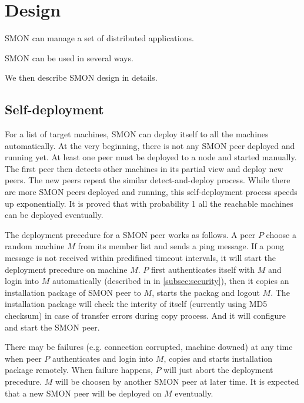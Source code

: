 \section{Design}


SMON can manage a set of distributed applications.

SMON can be used in several ways.

We then describe SMON design in details.

\subsection{Self-deployment}

For a list of target machines, SMON can deploy itself to all
the machines automatically. At the very beginning, there is
not any SMON peer deployed and running yet. At least one
peer must be deployed to a node and started manually.  The
first peer then detects other machines in its partial view
and deploy new peers. The new peers repeat the similar
detect-and-deploy process. While there are more SMON peers
deployed and running, this self-deployment process speeds up
exponentially. It is proved that with probability 1 all the
reachable machines can be deployed
eventually\cite{Eugster2004}.

The deployment precedure for a SMON peer works as follows.
A peer $P$ choose a random machine $M$ from its member list
and sends a ping message. If a pong message is not received
within predifined timeout intervals, it will start the
deployment precedure on machine $M$. $P$ first authenticates
itself with $M$ and login into $M$ automatically (described
in in \ref{subsec:security}), then it copies an installation
package of SMON peer to $M$, starts the packag and logout
$M$. The installation package will check the interity of
itself (currently using MD5 checksum) in case of transfer
errors during copy process. And it will configure and start
the SMON peer.

There may be failures (e.g. connection corrupted, machine
downed) at any time when peer $P$ authenticates and login
into $M$, copies and starts installation package remotely.
When failure happens, $P$ will just abort the deployment
precedure. $M$ will be choosen by another SMON peer at later
time. It is expected that a new SMON peer will be deployed
on $M$ eventually.

